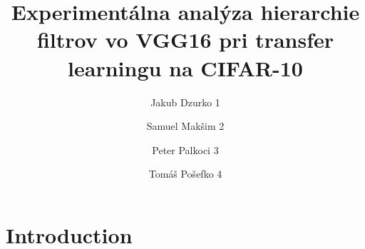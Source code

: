 \documentclass[runningheads]{llncs}
\begin{document}
\title{Experimentálna analýza hierarchie filtrov vo VGG16 pri transfer learningu na CIFAR-10}

\author{Jakub Dzurko 1 \and Samuel Makšim 2 \and Peter Palkoci 3 \and Tomáš Pošefko 4}


\maketitle

\section{Introduction}
\end{document}
